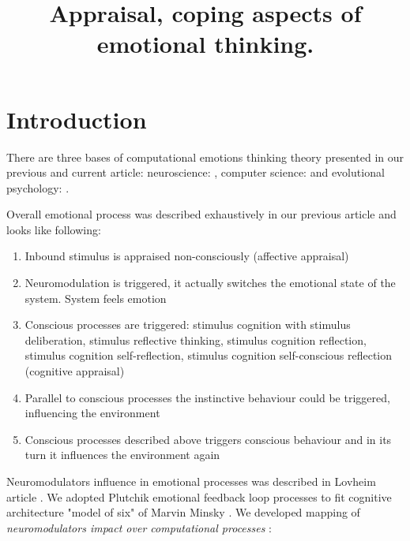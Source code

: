 \title{Appraisal, coping aspects of emotional thinking.}

\section{Introduction}

There are three bases of computational emotions thinking theory presented in our previous \cite{computational_emotional_thinking} and current article: neuroscience: \cite{emotionsbraintorobot, parsingreward, neuromodulatory, cubeofemotions, natureofemotions}, computer science: \cite{emotionandsociable, senticcomputing, hourglass, affectivemodelofinterplay, affectivecomputing, computationalmodelsemotion, computationalmodelsemotionscognition, evaluatingcomutationalmodel, threelevel} and evolutional psychology: \cite{natureofemotions, primer_affect_psychology, tomkins1, tomkins2, tomkins3, quest}.

Overall emotional process was described exhaustively in our previous article \cite{computational_emotional_thinking} and looks like following:

\begin{enumerate}
 \item  Inbound stimulus is appraised non-consciously (affective appraisal)
 \item  Neuromodulation is triggered, it actually switches the emotional state of the system. System feels emotion
 \item  Conscious processes are triggered: stimulus cognition with stimulus deliberation, stimulus reflective thinking, stimulus cognition reflection, stimulus cognition self-reflection, stimulus cognition self-conscious reflection (cognitive appraisal)
 \item  Parallel to conscious processes the instinctive behaviour could be triggered, influencing the environment
 \item  Conscious processes described above triggers conscious behaviour and in its turn it influences the environment again
\end{enumerate}

Neuromodulators influence in emotional processes was described in Lovheim article \cite{cubeofemotions}. We adopted Plutchik emotional feedback loop processes \cite{natureofemotions} to fit cognitive architecture "model of six" of Marvin Minsky \cite{emotionmachine}. We developed mapping of \emph{neuromodulators impact over computational processes} \cite{computational_emotional_thinking}:

